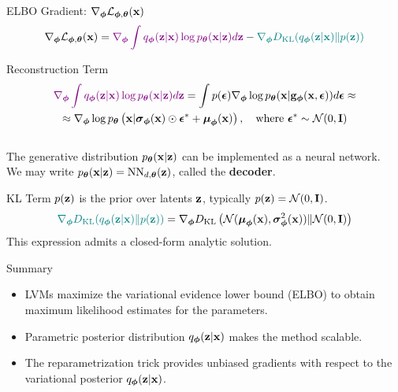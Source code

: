 \documentclass{beamer}
\begin{document}
\begin{frame}{ELBO Gradient: $\nabla_{\boldsymbol{\phi}} \mathcal{L}_{\boldsymbol{\phi}, \boldsymbol{\theta}}(\mathbf{x})$}
	\vspace{-0.3cm}
	\[
		\nabla_{\boldsymbol{\phi}} \mathcal{L}_{\boldsymbol{\phi}, \boldsymbol{\theta}}(\mathbf{x}) = {\color{violet}\nabla_{\boldsymbol{\phi}} \int q_{\boldsymbol{\phi}}(\mathbf{z}| \mathbf{x})\log p_{\boldsymbol{\theta}}(\mathbf{x} | \mathbf{z}) d \mathbf{z}} - {\color{teal}\nabla_{\boldsymbol{\phi}} D_\mathrm{KL}(q_{\boldsymbol{\phi}}(\mathbf{z}| \mathbf{x}) \| p(\mathbf{z}))}
	\]
	\eqpause
	\vspace{-0.3cm}
	\begin{block}{Reconstruction Term}
		\vspace{-0.7cm}
		\begin{multline*}
			 {\color{violet}\nabla_{\boldsymbol{\phi}} \int q_{\boldsymbol{\phi}}(\mathbf{z}| \mathbf{x})\log p_{\boldsymbol{\theta}}(\mathbf{x}| \mathbf{z}) d \mathbf{z}} = \int p(\boldsymbol{\epsilon}) \nabla_{\boldsymbol{\phi}} \log p_{\boldsymbol{\theta}}(\mathbf{x} | \mathbf{g}_{\boldsymbol{\phi}}(\mathbf{x}, \boldsymbol{\epsilon})) d\boldsymbol{\epsilon} \approx \\
			 \approx \nabla_{\boldsymbol{\phi}} \log p_{\boldsymbol{\theta}}\left(\mathbf{x} | \boldsymbol{\sigma}_{\boldsymbol{\phi}}(\mathbf{x}) \odot \boldsymbol{\epsilon}^* + \boldsymbol{\mu}_{\boldsymbol{\phi}}(\mathbf{x})\right), \quad \text{where } \boldsymbol{\epsilon}^* \sim \mathcal{N}(0, \mathbf{I})
		\end{multline*}
		\eqpause
		\vspace{-0.5cm} \\
		The generative distribution $p_{\boldsymbol{\theta}}(\mathbf{x} | \mathbf{z})$ can be implemented as a neural network. \\
		We may write $p_{\boldsymbol{\theta}}(\mathbf{x} | \mathbf{z}) = \mathrm{NN}_{d, \boldsymbol{\theta}}(\mathbf{z})$, called the \textbf{decoder}.
	\end{block}
	\eqpause
	\begin{block}{KL Term}
		$p(\mathbf{z})$ is the prior over latents $\mathbf{z}$, typically $p(\mathbf{z}) = \mathcal{N} (0, \mathbf{I})$.
		\[
			{\color{teal}\nabla_{\boldsymbol{\phi}} D_\mathrm{KL}(q_{\boldsymbol{\phi}}(\mathbf{z}| \mathbf{x}) \| p(\mathbf{z}))} = \nabla_{\boldsymbol{\phi}} D_\mathrm{KL}\left( \mathcal{N} (\boldsymbol{\mu}_{\boldsymbol{\phi}}(\mathbf{x}), \boldsymbol{\sigma}^2_{\boldsymbol{\phi}}(\mathbf{x})) \| \mathcal{N} (0, \mathbf{I}) \right)
		\]
		\eqpause
		This expression admits a closed-form analytic solution.
	\end{block}
\end{frame}
\begin{frame}{Summary}
	\begin{itemize}
		\item LVMs maximize the variational evidence lower bound (ELBO) to obtain maximum likelihood estimates for the parameters.
		\vfill
		\item Parametric posterior distribution $q_{\boldsymbol{\phi}}(\mathbf{z}| \mathbf{x})$ makes the method scalable.
		\vfill
		\item The reparametrization trick provides unbiased gradients with respect to the variational posterior $q_{\boldsymbol{\phi}}(\mathbf{z}| \mathbf{x})$.
	\end{itemize}
\end{frame}
\end{document}
